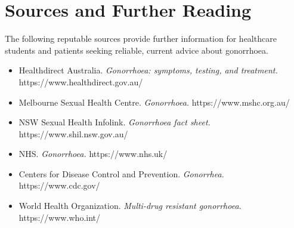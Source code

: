 \section*{Sources and Further Reading}
The following reputable sources provide further information for healthcare students and patients seeking reliable, current advice about gonorrhoea.

\begin{itemize}
    \item Healthdirect Australia. \textit{Gonorrhoea: symptoms, testing, and treatment.} https://www.healthdirect.gov.au/
    \item Melbourne Sexual Health Centre. \textit{Gonorrhoea.} https://www.mshc.org.au/
    \item NSW Sexual Health Infolink. \textit{Gonorrhoea fact sheet.} https://www.shil.nsw.gov.au/
    \item NHS. \textit{Gonorrhoea.} https://www.nhs.uk/
    \item Centers for Disease Control and Prevention. \textit{Gonorrhea.} https://www.cdc.gov/
    \item World Health Organization. \textit{Multi-drug resistant gonorrhoea.} https://www.who.int/
\end{itemize}
